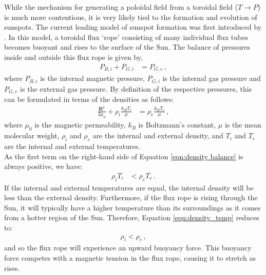 \documentclass[11pt,a4paper,onecolumn]{report}
\begin{document}
%
While the mechanism for generating a poloidal field from a toroidal field (\(T
\rightarrow P\)) is much more contentious, it is very likely tied to the
formation and evolution of sunspots. The current leading model of sunspot
formation was first introduced by \citet{parker_formation_1955}. In this model,
a toroidal flux `rope' consisting of many individual flux tubes becomes buoyant
and rises to the surface of the Sun. The balance of pressures inside and outside
this flux rope is given by,
\begin{align}
  P_{B,i} + P_{G,i} &= P_{G,e}\,,
\end{align}
where \(P_{B,i}\) is the internal magnetic pressure, \(P_{G,i}\) is the internal
gas pressure and \(P_{G,e}\) is the external gas pressure. By definition of the
respective pressures, this can be formulated in terms of the densities as
follows:
\begin{align}
  \label{eqn:density balance}
  \frac{\bm{B}^2}{2\mu_0} + \rho_i \frac{k_B T_i}{\mu} &= \rho_e \frac{k_B T_e}{\mu}\,,
\end{align}
where \(\mu_0 \) is the magnetic permeability, \(k_B\) is Boltzmann's constant,
\(\mu\) is the mean molecular weight, \(\rho_i\) and \(\rho_e\) are the internal
and external density, and \(T_i\) and \(T_e\) are the internal and external
temperatures.\\

\noindent As the first term on the right-hand side of Equation \ref{eqn:density balance}
is always positive, we have:
\begin{align}
  \label{eqn:density_temp}
  \rho_i T_i &< \rho_e T_e\,.
\end{align}
If the internal and external temperatures are equal, the internal density will
be less than the external density. Furthermore, if the flux rope is rising through
the Sun, it will typically have a higher temperature than its surroundings as
it comes from a hotter region of the Sun. Therefore, Equation
\ref{eqn:density_temp} reduces to:
\begin{align}
  \rho_i < \rho_e\,,
\end{align}
and so the flux rope will experience an upward buoyancy force. This
buoyancy force competes with a magnetic tension in the flux rope, causing it to
stretch as rises. \\
\end{document}
